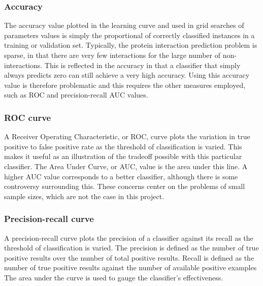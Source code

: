 \subsubsection*{Accuracy}
The accuracy value plotted in the learning curve and used in grid searches of parameters values is simply the proportional of correctly classified instances in a training or validation set.
Typically, the protein interaction prediction problem is sparse, in that there are very few interactions for the large number of non-interactions.
This is reflected in the accuracy in that a classifier that simply always predicts zero can still achieve a very high accuracy.
Using this accuracy value is therefore problematic and this requires the other measures employed, such as \ac{ROC} and precision-recall \ac{AUC} values.

\subsubsection*{\ac{ROC} curve}
A Receiver Operating Characteristic, or \ac{ROC}, curve plots the variation in true positive to false positive rate as the threshold of classification is varied.
This makes it useful as an illustration of the tradeoff possible with this particular classifier.
The Area Under Curve, or \ac{AUC}, value is the area under this line.
A higher \ac{AUC} value corresponds to a better classifier, although there is some controversy surrounding this\autocite{hanczar_small-sample_2010}.
These concerns center on the problems of small sample sizes, which are not the case in this project.

\subsubsection*{Precision-recall curve}
A precision-recall curve plots the precision of a classifier against its recall as the threshold of classification is varied.
The precision is defined as the number of true positive results over the number of total positive results.
Recall is defined as the number of true positive results against the number of available positive examples
The area under the curve is used to gauge the classifier's effectiveness.

